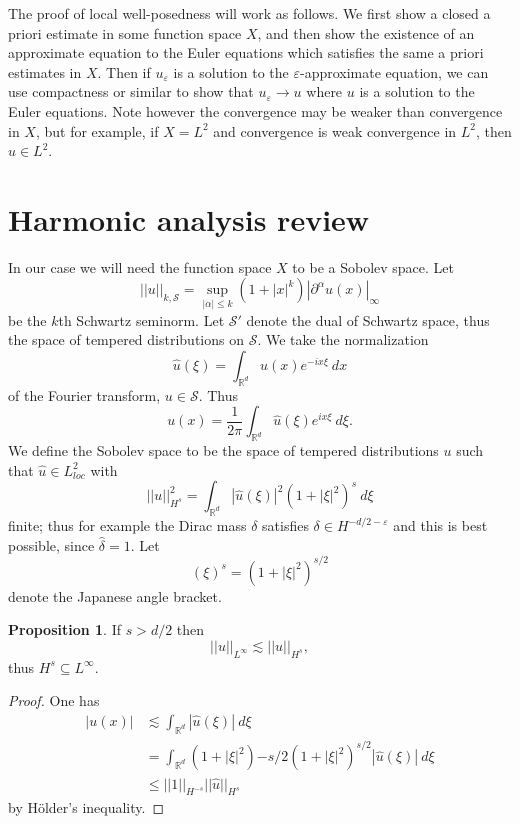\documentclass[12pt]{book}
\newcommand{\RR}{\mathbb{R}}
\newcommand{\Sch}{\mathscr S}
\theoremstyle{definition}
\newtheorem{proposition}[theorem]{Proposition}
\begin{document}
The proof of local well-posedness will work as follows.
We first show a closed a priori estimate in some function space $X$, and then show the existence of an approximate equation to the Euler equations which satisfies the same a priori estimates in $X$.
Then if $u_\varepsilon$ is a solution to the $\varepsilon$-approximate equation, we can use compactness or similar to show that $u_\varepsilon \to u$ where $u$ is a solution to the Euler equations.
Note however the convergence may be weaker than convergence in $X$, but for example, if $X = L^2$ and convergence is weak convergence in $L^2$, then $u \in L^2$.

\section{Harmonic analysis review}
In our case we will need the function space $X$ to be a Sobolev space.
Let
$$||u||_{k,\Sch} = \sup_{|\alpha| \leq k} (1 + |x|^k) |\partial^\alpha u(x)|_\infty$$
be the $k$th Schwartz seminorm.
Let $\Sch'$ denote the dual of Schwartz space, thus the space of tempered distributions on $\Sch$.
We take the normalization
$$\hat u(\xi) = \int_{\RR^d} u(x) e^{-ix\xi} ~dx$$
of the Fourier transform, $u \in \Sch$.
Thus
$$u(x) = \frac{1}{2\pi} \int_{\RR^d} \hat u(\xi) e^{ix\xi} ~d\xi.$$
We define the Sobolev space to be the space of tempered distributions $u$ such that $\hat u \in L^2_{loc}$ with
$$||u||_{H^s}^2 = \int_{\RR^d} |\hat u(\xi)|^2 (1 + |\xi|^2)^s ~d\xi$$
finite; thus for example the Dirac mass $\delta$ satisfies $\delta \in H^{-d/2-\varepsilon}$ and this is best possible, since $\hat \delta = 1$.
Let
$$(\xi)^s = (1 + |\xi|^2)^{s/2}$$
denote the Japanese angle bracket.

\begin{proposition}
If $s > d/2$ then
$$||u||_{L^\infty} \lesssim ||u||_{H^s},$$
thus $H^s \subseteq L^\infty$.
\end{proposition}
\begin{proof}
One has
\begin{align*}|u(x)| &\lesssim \int_{\RR^d} |\hat u(\xi)| ~d\xi\\
&= \int_{\RR^d} (1 + |\xi|^2){-s/2} (1 + |\xi|^2)^{s/2} |\hat u(\xi)| ~d\xi\\
&\leq ||1||_{H^{-s}} ||\hat u||_{H^s}
\end{align*}
by H\"older's inequality.
\end{proof}
\end{document}
